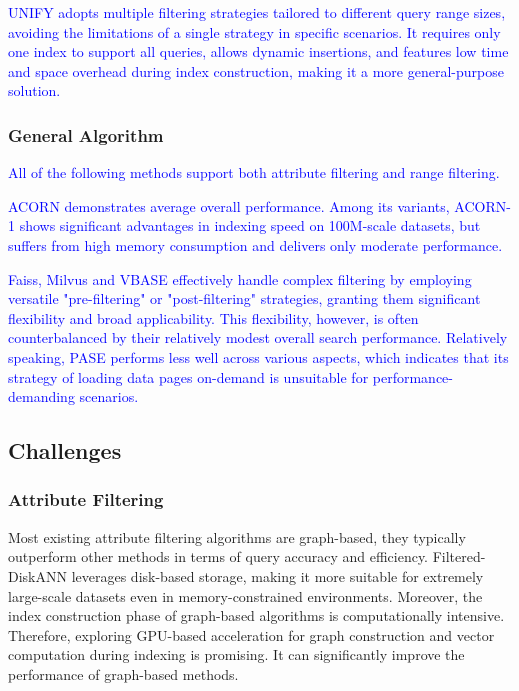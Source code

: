 \documentclass[sigconf, nonacm]{acmart}
\begin{document}
{		\textcolor{blue}{
	UNIFY adopts multiple filtering strategies tailored to different query range sizes, avoiding the limitations of a single strategy in specific scenarios. It requires only one index to support all queries, allows dynamic insertions, and features low time and space overhead during index construction, making it a more general-purpose solution.}

	\subsubsection{General Algorithm}
\textcolor{blue}{All of the following methods support both attribute filtering and range filtering.}

\textcolor{blue}{
ACORN demonstrates average overall performance. Among its variants, ACORN-1 shows significant advantages in indexing speed on 100M-scale datasets, but suffers from high memory consumption and delivers only moderate performance.}

\textcolor{blue}{
Faiss, Milvus and VBASE effectively handle complex filtering by employing versatile "pre-filtering" or "post-filtering" strategies, granting them significant flexibility and broad applicability. This flexibility, however, is often counterbalanced by their relatively modest overall search performance. Relatively speaking, PASE performs less well across various aspects, which indicates that its strategy of loading data pages on-demand is unsuitable for performance-demanding scenarios.}
	
	\subsection{Challenges}
	\subsubsection{Attribute Filtering}
	Most existing attribute filtering algorithms are graph-based, they typically outperform other methods in terms of query accuracy and efficiency. Filtered-DiskANN leverages disk-based storage, making it more suitable for extremely large-scale datasets even in memory-constrained environments. Moreover, the index construction phase of graph-based algorithms is computationally intensive. Therefore, exploring GPU-based acceleration for graph construction and vector computation during indexing is promising. It can significantly improve the performance of graph-based methods.
	
}
\end{document}
